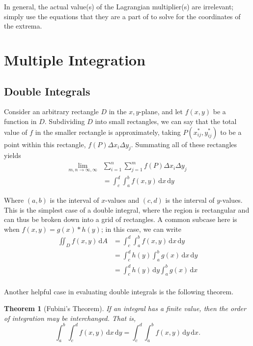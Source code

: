 \documentclass[12pt]{article}
\newtheorem{theorem}{Theorem}
\begin{document}
{In general, the actual value(s) of the Lagrangian multiplier(s) are irrelevant; simply use the equations that they are a part of to solve for the coordinates of the extrema.

\section{Multiple Integration}
\subsection{Double Integrals}
Consider an arbitrary rectangle $D$ in the $x,y$-plane, and let $f(x,y)$ be a function in $D$. Subdividing $D$ into small rectangles, we can say that the total value of $f$ in the smaller rectangle is approximately, taking $P(x^*_{ij}, y^*_{ij})$ to be a point within this rectangle, $f(P) \Delta x_i \Delta y_j$. Summating all of these rectangles yields \begin{align*}
    \lim_{m, n \to \infty, \infty}& \sum_{i = 1}^n \sum_{j=1}^m f(P) \Delta x_i \Delta y_j \\
    &= \int_c^d \int_a^b f(x,y) \, \text{d}x \, \text{d}y
\end{align*}

Where $(a,b)$ is the interval of $x$-values and $(c,d)$ is the interval of $y$-values. This is the simplest case of a double integral, where the region is rectangular and can thus be broken down into a grid of rectangles. A common subcase here is when $f(x,y) = g(x) * h(y)$; in this case, we can write \begin{align*}
   \iint_D f(x,y) \, \text{d}A &= \int_c^d \int_a^b f(x,y) \, \text{d}x \, \text{d}y\\
   &= \int_c^d h(y) \int_a^b g(x) \, \text{d}x \, \text{d}y\\
   &= \int_c^d h(y) \, \text{d}y \int_a^b g(x) \, \text{d}x\\
\end{align*}

Another helpful case in evaluating double integrals is the following theorem.

\begin{theorem}[Fubini's Theorem]
    If an integral has a finite value, then the order of integration may be interchanged. That is, \[\int_a^b \int_c^d f(x,y) \,\text{d}x\,\text{d}y = \int_c^d \int_a^b f(x,y) \,\text{d}y \,\text{d}x.\]
\end{theorem}

}
\end{document}

